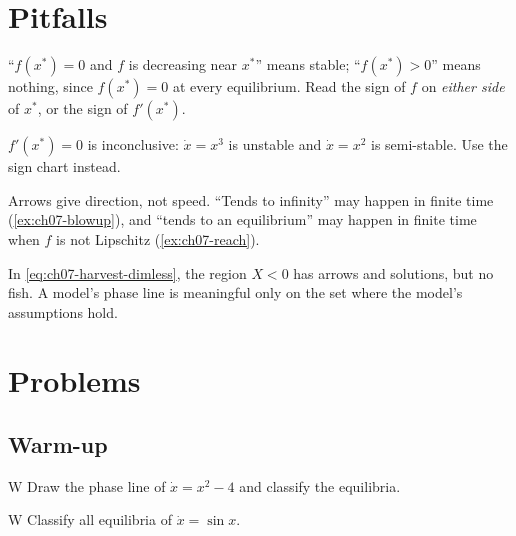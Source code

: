 \section{Pitfalls}\label{sec:ch07-pitfalls}

\begin{pitfall}\label{pit:ch07-sign}
``$f(x^*) = 0$ and $f$ is decreasing near $x^*$'' means stable; ``$f(x^*)>0$''
means nothing, since $f(x^*) = 0$ at every equilibrium. Read the sign of $f$ on
\emph{either side} of $x^*$, or the sign of $f'(x^*)$.
\end{pitfall}

\begin{pitfall}[Treating $f'(x^*) = 0$ as stable]\label{pit:ch07-degenerate}
$f'(x^*) = 0$ is inconclusive: $\dot x = x^3$ is unstable and $\dot x = x^2$ is
semi-stable. Use the sign chart instead.
\end{pitfall}

\begin{pitfall}\label{pit:ch07-time}
Arrows give direction, not speed. ``Tends to infinity'' may happen in finite
time (\cref{ex:ch07-blowup}), and ``tends to an equilibrium'' may happen in
finite time when $f$ is not Lipschitz (\cref{ex:ch07-reach}).
\end{pitfall}

\begin{pitfall}\label{pit:ch07-domain}
In \eqref{eq:ch07-harvest-dimless}, the region $X<0$ has arrows and solutions,
but no fish. A model's phase line is meaningful only on the set where the
model's assumptions hold.
\end{pitfall}

\section{Problems}\label{sec:ch07-problems}

\subsection*{Warm-up}

\begin{problem}{W}\label{prob:ch07-w1}
Draw the phase line of $\dot x = x^2 - 4$ and classify the equilibria.
\end{problem}

\begin{problem}{W}\label{prob:ch07-w2}
Classify all equilibria of $\dot x = \sin x$.
\end{problem}

